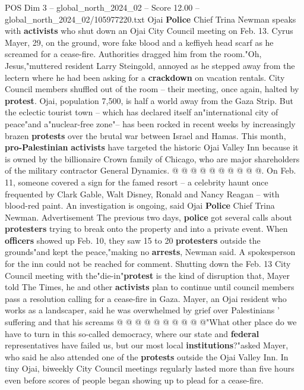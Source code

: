 \begin{textsample}{POS Dim 3 – global\_north\_2024\_02 – Score 12.00 – global\_north\_2024\_02/105977220.txt}  \label{ex:f3_pos_255}
Ojai \textbf{Police} Chief Trina Newman speaks with \textbf{activists} who shut down an Ojai City Council meeting on Feb. 13.
Cyrus Mayer, 29, on the ground, wore fake blood and a keffiyeh head scarf as he screamed for a cease-fire.
Authorities dragged him from the room."Oh, Jesus,"muttered resident Larry Steingold, annoyed as he stepped away from the lectern where he had been asking for a \textbf{crackdown} on vacation rentals.
City Council members shuffled out of the room -- their meeting, once again, halted by \textbf{protest}.
Ojai, population 7,500, is half a world away from the Gaza Strip.
But the eclectic tourist town -- which has declared itself an"international city of peace"and a"nuclear-free zone"-- has been rocked in recent weeks by increasingly brazen \textbf{protests} over the brutal war between Israel and Hamas.
This month, \textbf{pro-Palestinian} \textbf{activists} have targeted the historic Ojai Valley Inn because it is owned by the billionaire Crown family of Chicago, who are major shareholders of the military contractor General Dynamics. @ @ @ @ @ @ @ @ @ @.
On Feb. 11, someone covered a sign for the famed resort -- a celebrity haunt once frequented by Clark Gable, Walt Disney, Ronald and Nancy Reagan -- with blood-red paint.
An investigation is ongoing, said Ojai \textbf{Police} Chief Trina Newman.
Advertisement The previous two days, \textbf{police} got several calls about \textbf{protesters} trying to break onto the property and into a private event.
When \textbf{officers} showed up Feb. 10, they saw 15 to 20 \textbf{protesters} outside the grounds"and kept the peace,"making no \textbf{arrests}, Newman said.
A spokesperson for the inn could not be reached for comment.
Shutting down the Feb. 13 City Council meeting with the"die-in"\textbf{protest} is the kind of disruption that, Mayer told The Times, he and other \textbf{activists} plan to continue until council members pass a resolution calling for a cease-fire in Gaza.
Mayer, an Ojai resident who works as a landscaper, said he was overwhelmed by grief over Palestinians ' suffering and that his screams @ @ @ @ @ @ @ @ @ @"What other place do we have to turn in this so-called democracy, where our state and \textbf{federal} representatives have failed us, but our most local \textbf{institutions}?"asked Mayer, who said he also attended one of the \textbf{protests} outside the Ojai Valley Inn.
In tiny Ojai, biweekly City Council meetings regularly lasted more than five hours even before scores of people began showing up to plead for a cease-fire.

\end{textsample}
